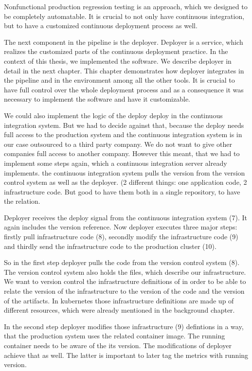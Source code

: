 Nonfunctional production regression testing is an approach, which we designed to be
completely automatable. It is crucial to not only have continuous integration, but to have
a customized continuous deployment process as well.

The next component in the pipeline is the deployer. Deployer is a service, which realizes
the customized parts of the continuous deployment practice. In the context of this thesis,
we implemented the software. We describe deployer in detail in the next chapter. This
chapter demonstrates how deployer integrates in the pipeline and in the environment among
all the other tools. It is crucial to have full control over the whole deployment process
and as a consequence it was necessary to implement the software and have it customizable.

We could also implement the logic of the deploy deploy in the continuous integration
system. But we had to decide against that, because the deploy needs full access to the
production system and the continuous integration system is in our case outsourced to a
third party company. We do not want to give other companies full access to another
company. However this meant, that we had to implement some steps again, which a continuous
integration server already implements.  the continuous integration system pulls the
version from the version control system as well as the deployer. (2 different things: one
application code, 2 infrastructure code. But good to have them both in a single
repository, to have the relation.

Deployer receives the deploy signal from the continuous integration system (7). It again
includes the version reference. Now deployer executes three major steps: firstly pull
infrastructure code (8), secondly modify the infrastructure code (9) and thirdly send the
infrastructure code to the production cluster (10).

So in the first step deployer pulls the code from the version control system (8). The
version control system also holds the files, which describe our infrastructure. We want to
version control the infrastructure definitions of in order to be able to relate the
version of the infrastructure to the version of the code and the version of the
artifacts. In kubernetes those infrastructure definitions are made up of different
resources, which were already mentioned in the background chapter.

In the second step deployer modifies those infrastructure (9) defintions in a way, that
the production system uses the related container image. The running container needs to be
aware of the its version. The modifications of deployer achieve that as well. The latter
is important to later tag the metrics with running version.

